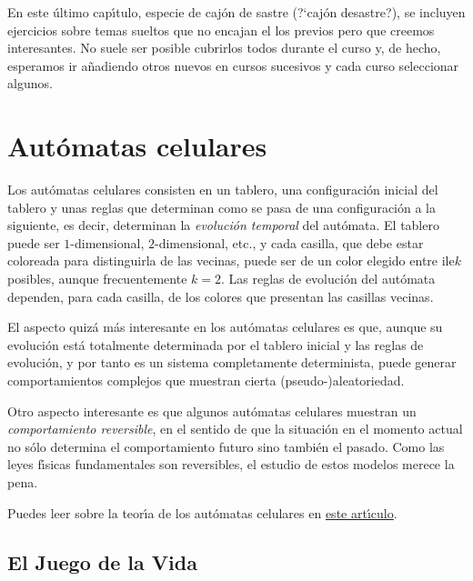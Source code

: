 
En este \'ultimo cap\'{\i}tulo, especie de caj\'on de sastre (?`caj\'on 
desastre?),  se incluyen ejercicios sobre temas sueltos que no encajan el los 
previos pero que creemos interesantes. No suele ser posible cubrirlos todos 
durante el curso y, de hecho,  esperamos ir a\~nadiendo otros nuevos en cursos 
sucesivos y cada curso seleccionar algunos.




\section{Aut\'omatas celulares}


Los aut\'omatas celulares consisten en un tablero, una configuraci\'on inicial 
del tablero y unas reglas que determinan como se pasa de una configuraci\'on a 
la siguiente, es decir, determinan la {\itshape evoluci\'on temporal} del 
aut\'omata. El tablero puede ser $1$-dimensional, $2$-dimensional, etc., y cada 
casilla, que debe estar coloreada para distinguirla de las vecinas, puede ser 
de 
un color elegido entre ile$k$ posibles, aunque frecuentemente $k=2$. Las reglas de 
evoluci\'on del aut\'omata dependen, para cada casilla,  de los colores que 
presentan las casillas vecinas. 

El aspecto quiz\'a m\'as interesante en los aut\'omatas celulares es que, 
aunque 
su evoluci\'on est\'a totalmente determinada por el tablero inicial y las 
reglas 
de evoluci\'on, y por tanto es un sistema completamente determinista, puede 
generar comportamientos complejos que muestran cierta (pseudo-)aleatoriedad. 

Otro aspecto interesante es que algunos aut\'omatas celulares muestran un 
{\itshape comportamiento reversible}, en el sentido de que la situaci\'on en el 
momento actual no s\'olo determina el comportamiento futuro sino tambi\'en el 
pasado. Como las leyes f\'{\i}sicas fundamentales son reversibles, el estudio 
de 
estos modelos merece la pena.

Puedes leer sobre la teor\'{\i}a de los aut\'omatas celulares en 
\href{http://150.244.21.37/PDFs/MISCE/ca-review.pdf}{este art\'{\i}culo}. 

\subsection{El Juego de la Vida}


